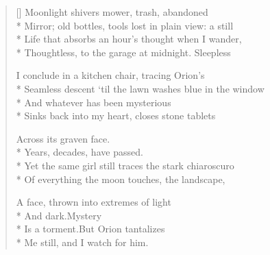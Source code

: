 \label{ch:listening_to_neil_young}
\settowidth{\versewidth}{Seamless descent 'til the lawn washes blue in the window}
\begin{verse}[\versewidth]
Moonlight shivers mower, trash, abandoned\\*
Mirror; old bottles, tools lost in plain view: a still\\*
Life that absorbs an hour's thought when I wander,\\*
Thoughtless, to the garage at midnight.   Sleepless

I conclude in a kitchen chair, tracing Orion's\\*
Seamless descent `til the lawn washes blue in the window\\*
And whatever has been mysterious\\*
Sinks back into my heart, closes stone tablets

Across its graven face.\\*
\hspace*{3\vgap} Years, decades, have passed.\\*
Yet the same girl still traces the stark chiaroscuro\\*
Of everything the moon touches, the landscape,

A face, thrown into extremes of light\\*
And dark.\qquad Mystery\\*
Is a torment.\qquad But Orion tantalizes\\*
Me still, and I watch for him.
\end{verse}
